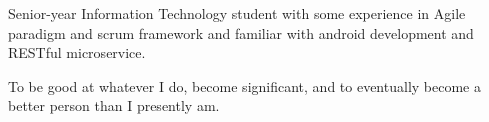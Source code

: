 

\begin{cvparagraph}
Senior-year Information Technology student with some experience in Agile paradigm and scrum framework and familiar with android development and RESTful microservice.
\end{cvparagraph}
\begin{cvparagraph}
To be good at whatever I do, become significant, and to eventually become a better person than I presently am.
\end{cvparagraph}
